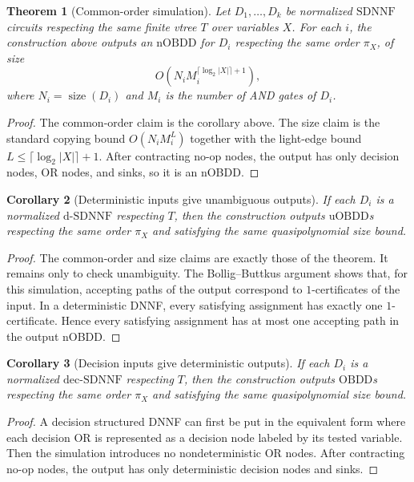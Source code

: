 \documentclass[11pt]{article}
\theoremstyle{plain}
\newtheorem{theorem}{Theorem}
\newtheorem{corollary}[theorem]{Corollary}
\theoremstyle{definition}
\theoremstyle{remark}
\newcommand{\size}{\operatorname{size}}
\newcommand{\OBDD}{\mathrm{OBDD}}
\newcommand{\nOBDD}{\mathrm{nOBDD}}
\newcommand{\uOBDD}{\mathrm{uOBDD}}
\newcommand{\SDNNF}{\mathrm{SDNNF}}
\newcommand{\dSDNNF}{\mathrm{d}\mbox{-}\mathrm{SDNNF}}
\newcommand{\decSDNNF}{\mathrm{dec}\mbox{-}\mathrm{SDNNF}}
\begin{document}
\begin{theorem}[Common-order simulation]
Let $D_1,\ldots,D_k$ be normalized $\SDNNF$ circuits respecting the same finite
vtree $T$ over variables $X$.
For each $i$, the construction above outputs an $\nOBDD$ for $D_i$ respecting the
same order $\pi_X$, of size
\[
  O\!\left(N_iM_i^{\lceil \log_2 |X| \rceil + 1}\right),
\]
where $N_i=\size(D_i)$ and $M_i$ is the number of AND gates of $D_i$.
\end{theorem}

\begin{proof}
The common-order claim is the corollary above.  The size claim is the standard
copying bound $O(N_iM_i^L)$ together with the light-edge bound
$L\leq \lceil \log_2 |X| \rceil+1$.  After contracting no-op nodes, the output
has only decision nodes, OR nodes, and sinks, so it is an nOBDD.
\end{proof}

\begin{corollary}[Deterministic inputs give unambiguous outputs]
If each $D_i$ is a normalized $\dSDNNF$ respecting $T$, then the construction
outputs $\uOBDD$s respecting the same order $\pi_X$ and satisfying the same
quasipolynomial size bound.
\end{corollary}

\begin{proof}
The common-order and size claims are exactly those of the theorem.  It remains
only to check unambiguity.  The Bollig--Buttkus argument shows that, for this
simulation, accepting paths of the output correspond to $1$-certificates of the
input.  In a deterministic DNNF, every satisfying assignment has exactly one
$1$-certificate.  Hence every satisfying assignment has at most one accepting
path in the output nOBDD.
\end{proof}

\begin{corollary}[Decision inputs give deterministic outputs]
If each $D_i$ is a normalized $\decSDNNF$ respecting $T$, then the construction
outputs $\OBDD$s respecting the same order $\pi_X$ and satisfying the same
quasipolynomial size bound.
\end{corollary}

\begin{proof}
A decision structured DNNF can first be put in the equivalent form where each
decision OR is represented as a decision node labeled by its tested variable.
Then the simulation introduces no nondeterministic OR nodes.  After contracting
no-op nodes, the output has only deterministic decision nodes and sinks.
\end{proof}
\end{document}
